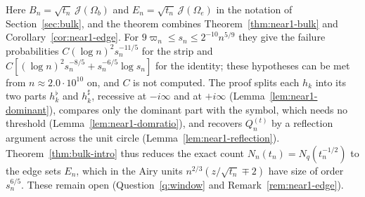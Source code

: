 \documentclass[11pt]{amsart}
\theoremstyle{definition}
\theoremstyle{remark}
\numberwithin{equation}{section}
\begin{document}
Here $B_n=\sqrt{t_n}\,\mathcal J(\Omega_b)$ and $E_n=\sqrt{t_n}\,\mathcal J(\Omega_e)$ in the notation of Section~\ref{sec:bulk}, and the theorem combines Theorem~\ref{thm:near1-bulk} and Corollary~\ref{cor:near1-edge}. For $9\varpi_n\le s_n\le2^{-10}n^{5/9}$ they give the failure probabilities $C(\log n)^2s_n^{-11/5}$ for the strip and $C[(\log n)^2s_n^{-8/5}+s_n^{-6/5}\log s_n]$ for the identity; these hypotheses can be met from $n\approx2.0\cdot10^{10}$ on, and $C$ is not computed. The proof splits each $h_k$ into its two parts $h_k^\flat$ and $h_k^\sharp$, recessive at $-i\infty$ and at $+i\infty$ (Lemma~\ref{lem:near1-dominant}), compares only the dominant part with the symbol, which needs no threshold (Lemma~\ref{lem:near1-domratio}), and recovers $Q_n^{(t)}$ by a reflection argument across the unit circle (Lemma~\ref{lem:near1-reflection}). Theorem~\ref{thm:bulk-intro} thus reduces the exact count $N_n(t_n)=N_q(t_n^{-1/2})$ to the edge sets $E_n$, which in the Airy units $n^{2/3}(z/\sqrt{t_n}\mp2)$ have size of order $s_n^{6/5}$. These remain open (Question~\ref{q:window} and Remark~\ref{rem:near1-edge}).
\end{document}
